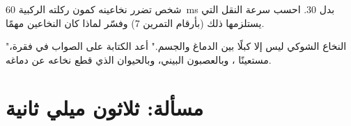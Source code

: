 \begin{exercise}[$\star\star\star$]\label{exo:g12:stretch-reflex:14}
شخص تضرر نخاعينه كمون ركلته الركبية \qty{60}{ms} بدل 30. احسب سرعة
النقل التي يستلزمها ذلك (بأرقام التمرين 7) وفسّر لماذا كان النخاعين
مهمًا.
\end{exercise}

\begin{exercise}[$\star\star\star$]\label{exo:g12:stretch-reflex:15}
"النخاع الشوكي ليس إلا كبلًا بين الدماغ والجسم." أعد الكتابة على
الصواب في فقرة، مستعينًا ، وبالعصبون البيني، وبالحيوان الذي قطع
نخاعه عن دماغه.
\end{exercise}

\section{مسألة: ثلاثون ميلي ثانية}

